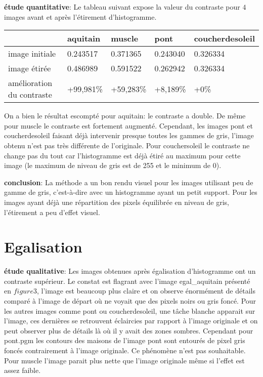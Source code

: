 \documentclass[12pt]{article}
\numberwithin{equation}{section}
\begin{document}
\textbf{étude quantitative}: Le tableau suivant expose la valeur du contraste pour $4$ images avant et après l'étirement d'histogramme.\\
\begin{center}
  \begin{tabular}{|l|l|l|l|l|}
    \hline
    & aquitain & muscle & pont & coucherdesoleil\\
    \hline
    image initiale & 0.243517 & 0.371365 & 0.243040 & 0.326334\\
    \hline
    image étirée & 0.486989 & 0.591522 & 0.262942 & 0.326334 \\
    \hline
    amélioration du contraste & +99,981\% & +59,283\% & +8,189\% & +0\% \\
    \hline
  \end{tabular}
\end{center}
On a bien le résultat escompté pour aquitain: le contraste a double. De même pour muscle le contraste est fortement augmenté. Cependant, les images pont et coucherdesoleil faisant déjà intervenir presque toutes les gammes de gris, l'image obtenu n'est pas très différente de l'originale. Pour couchersoleil le contraste ne change pas du tout car l'histogramme est déjà étiré au maximum pour cette image (le maximum de niveau de gris est de 255 et le minimum de 0).

\textbf{conclusion}: La méthode a un bon rendu visuel pour les images utilisant peu de gamme de gris, c'est-à-dire avec un histogramme ayant un petit support. Pour les images ayant déjà une répartition des pixels équilibrée en niveau de gris, l'étirement a peu d'effet visuel.

\section{Egalisation}

\textbf{étude qualitative}: Les images obtenues après égalisation d'histogramme ont un contraste supérieur. Le constat est flagrant avec l'image egal\_aquitain présenté en $figure 3$, l'image est beaucoup plus claire et on observe énormément de détails comparé à l'image de départ où ne voyait que des pixels noirs ou gris foncé. Pour les autres images comme pont ou coucherdesoleil, une tâche blanche apparait sur l'image, ces dernières se retrouvent éclaircies par rapport à l'image originale et on peut observer plus de détails là où il y avait des zones sombres. Cependant pour pont.pgm les contours des maisons de l'image pont sont entourés de pixel gris foncés contrairement à l'image originale. Ce phénomène n'est pas souhaitable. Pour muscle l'image parait plus nette que l'image originale même si l'effet est assez faible.
\end{document}
